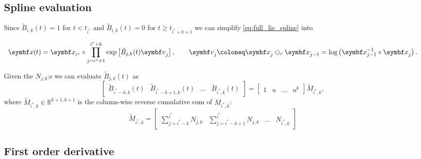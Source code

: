 \subsection{Spline evaluation}

Since $\tilde B_{i, k}(t) = 1$ for $t < t_{i^*}$ and $\tilde B_{i, k}(t) = 0$ for $t \geq t_{i^* + k + 1}$ we can simplify \eqref{eq:full_lie_spline} into
\begin{important}
  \begin{equation}
    \label{eq:simple_lie_spline}
    \x(t) = \x_{i^*} \circ \prod_{j=i^*+1}^{i^* + k} \exp \left[ \tilde B_{j, k} (t) \bv_j \right], \qquad \bv_j \coloneq \x_j \ominus_r \x_{j-1} = \log \left( \x_{j-1}^{-1} \circ \x_j \right).
  \end{equation}
\end{important}
Given the $N_{j, k}$:s we can evaluate $\tilde B_{j, k}(t)$ as
\begin{equation}
  \begin{bmatrix} \tilde B_{i^* - k, k}(t) & \tilde B_{i^* - k+1, k}(t) & \hdots & \tilde B_{i^*, k}(t) \end{bmatrix}  = \begin{bmatrix} 1 & u & \hdots & u^k \end{bmatrix} \tilde M_{i^*, k},
\end{equation}
where $\tilde M_{i^*, k} \in \mathbb{R}^{k+1, k+1}$ is the column-wise reverse cumulative sum of $M_{i^*,k}$:
\begin{equation}
  \label{eq:cumulative_coeff_matrix}
  \tilde M_{i^*, k} = \begin{bmatrix} \sum\limits_{j=i^*-k}^{i^*} N_{j,k} & \sum\limits_{j=i^*-k+1}^{i^*} N_{j,k} & \hdots & N_{i^*,k} \end{bmatrix}
\end{equation}

\subsection{First order derivative}

